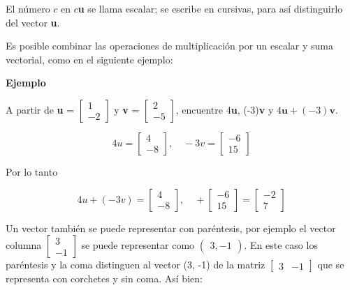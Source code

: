 \documentclass{article}
\begin{document}
El número $c$ en $c$\textbf{u} se llama escalar; se escribe en cursivas, para así distinguirlo del vector \textbf{u}.

Es posible combinar las operaciones de multiplicación por un escalar y suma vectorial, como en el siguiente ejemplo:

\pagebreak

\begin{large}
    \textbf{Ejemplo}
\end{large}

A partir de \textbf{u} = $\begin{bmatrix} 1\\-2 \end{bmatrix}$ y \textbf{v} = $\begin{bmatrix} 2\\-5 \end{bmatrix}$, encuentre 4\textbf{u}, (-3)\textbf{v} y $4\textbf{u} + (-3)\textbf{v}$.

\begin{equation*}
    4u = \begin{bmatrix}
        4\\
        -8
    \end{bmatrix} 
    ,\quad 
    -3v = \begin{bmatrix}
        -6\\
        15
    \end{bmatrix}
\end{equation*}

Por lo tanto

\begin{equation*}
    4u + (-3v) = \begin{bmatrix}
        4\\
        -8
    \end{bmatrix} 
    ,\quad 
    + \begin{bmatrix}
        -6\\
        15
    \end{bmatrix}
    = \begin{bmatrix}
        -2\\
        7
    \end{bmatrix}
\end{equation*}

Un vector también se puede representar con paréntesis, por ejemplo el vector columna $\begin{bmatrix} 3\\-1 \end{bmatrix}$ se puede representar como $\begin{pmatrix} 3, -1 \end{pmatrix}$. En este caso los paréntesis y la coma distinguen al vector (3, -1) de la matriz $\begin{bmatrix} 3 & -1 \end{bmatrix}$ que se representa con corchetes y sin coma. Así bien: 
\end{document}
